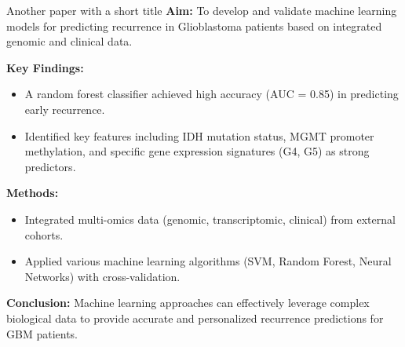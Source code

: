 \documentclass[twocolumn]{article}
\begin{document}
\begin{literaturepaper}{Another paper with a short title \cite{AnotherPaper2020}}
\label{paper-summary-2}
    \textbf{Aim:} To develop and validate machine learning models for predicting recurrence in Glioblastoma patients based on integrated genomic and clinical data.

    \textbf{Key Findings:}
    \begin{itemize}
        \item A random forest classifier achieved high accuracy (AUC = 0.85) in predicting early recurrence.
        \item Identified key features including IDH mutation status, MGMT promoter methylation, and specific gene expression signatures (G4, G5) as strong predictors.
    \end{itemize}

    \textbf{Methods:}
    \begin{itemize}
        \item Integrated multi-omics data (genomic, transcriptomic, clinical) from external cohorts.
        \item Applied various machine learning algorithms (SVM, Random Forest, Neural Networks) with cross-validation.
    \end{itemize}

    \textbf{Conclusion:} Machine learning approaches can effectively leverage complex biological data to provide accurate and personalized recurrence predictions for GBM patients.
\end{literaturepaper}

\end{document}
